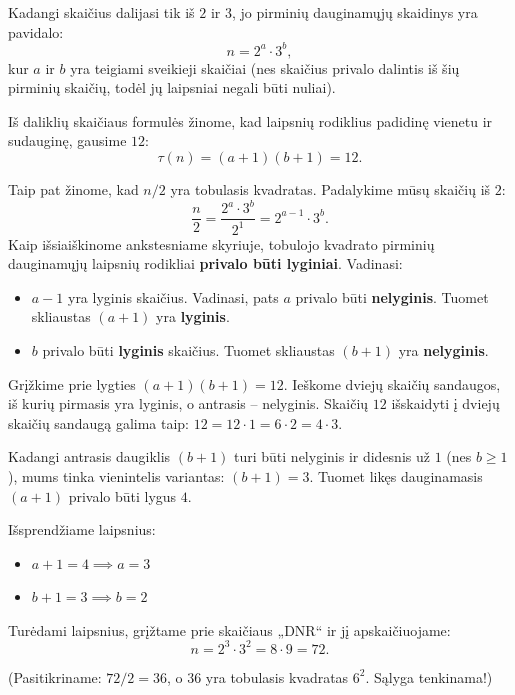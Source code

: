 \documentclass[11pt,a4paper]{scrartcl}
\begin{document}
\begin{solution}
Kadangi skaičius dalijasi tik iš $2$ ir $3$, jo pirminių dauginamųjų skaidinys yra pavidalo:
\begin{equation*} n = 2^a \cdot 3^b, \end{equation*}
kur \(a\) ir \(b\) yra teigiami sveikieji skaičiai (nes skaičius privalo dalintis iš šių pirminių skaičių, todėl jų laipsniai negali būti nuliai).

Iš daliklių skaičiaus formulės žinome, kad laipsnių rodiklius padidinę vienetu ir sudauginę, gausime $12$:
\begin{equation*} \tau(n) = (a + 1)(b + 1) = 12. \end{equation*}

Taip pat žinome, kad \(n / 2\) yra tobulasis kvadratas. Padalykime mūsų skaičių iš $2$:
\begin{equation*} \frac{n}{2} = \frac{2^a \cdot 3^b}{2^1} = 2^{a-1} \cdot 3^b. \end{equation*}
Kaip išsiaiškinome ankstesniame skyriuje, tobulojo kvadrato pirminių dauginamųjų laipsnių rodikliai \textbf{privalo būti lyginiai}. Vadinasi:
\begin{itemize}
    \item \(a - 1\) yra lyginis skaičius. Vadinasi, pats \(a\) privalo būti \textbf{nelyginis}. Tuomet skliaustas \((a + 1)\) yra \textbf{lyginis}.
    \item \(b\) privalo būti \textbf{lyginis} skaičius. Tuomet skliaustas \((b + 1)\) yra \textbf{nelyginis}.
\end{itemize}

Grįžkime prie lygties \((a + 1)(b + 1) = 12\). Ieškome dviejų skaičių sandaugos, iš kurių pirmasis yra lyginis, o antrasis – nelyginis. 
Skaičių $12$ išskaidyti į dviejų skaičių sandaugą galima taip: \(12 = 12 \cdot 1 = 6 \cdot 2 = 4 \cdot 3\).

Kadangi antrasis daugiklis \((b+1)\) turi būti nelyginis ir didesnis už $1$ (nes \(b \ge 1\)), mums tinka vienintelis variantas: \((b+1) = 3\). Tuomet likęs dauginamasis \((a+1)\) privalo būti lygus $4$.

Išsprendžiame laipsnius:
\begin{itemize}
    \item \(a + 1 = 4 \implies a = 3\)
    \item \(b + 1 = 3 \implies b = 2\)
\end{itemize}

Turėdami laipsnius, grįžtame prie skaičiaus „DNR“ ir jį apskaičiuojame:
\begin{equation*} n = 2^3 \cdot 3^2 = 8 \cdot 9 = 72. \end{equation*}

(Pasitikriname: \(72 / 2 = 36\), o $36$ yra tobulasis kvadratas \(6^2\). Sąlyga tenkinama!)

\end{solution}
\end{document}
